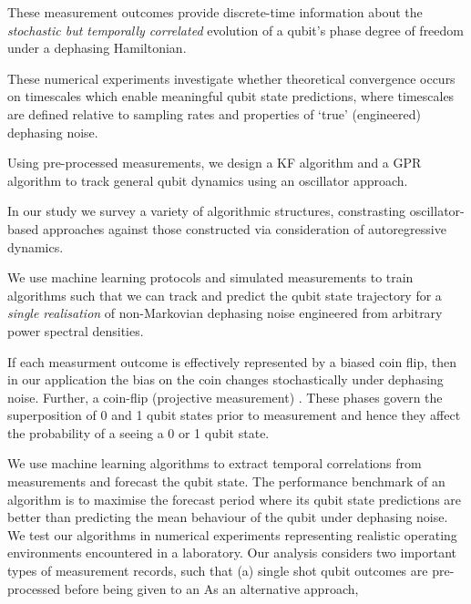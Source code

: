 \iffalse
These measurement outcomes provide discrete-time information about the \emph{stochastic but temporally correlated} evolution of a qubit's phase degree of freedom under a dephasing Hamiltonian. 

These numerical experiments investigate whether theoretical convergence occurs on timescales which enable meaningful qubit state predictions, where timescales are defined relative to sampling rates and properties of `true' (engineered) dephasing noise. 

 Using pre-processed measurements, we design a KF algorithm and a GPR algorithm to track general qubit dynamics using an oscillator approach. 
 
 In our study we survey a variety of algorithmic structures, constrasting oscillator-based approaches against those constructed via consideration of autoregressive dynamics. 
 
 We use machine learning protocols and simulated measurements to train algorithms such that we can track and predict the qubit state trajectory for a \textit{single realisation} of non-Markovian dephasing noise engineered from arbitrary power spectral densities.
  
  If each measurment outcome is effectively represented by a biased coin flip, then in our application the bias on the coin changes stochastically under dephasing noise. Further, a coin-flip (projective measurement) . These phases govern the superposition of 0 and 1 qubit states prior to measurement and hence they affect the probability of a seeing a 0 or 1 qubit state. 
 
 We use machine learning algorithms to extract temporal correlations from measurements and forecast the qubit state. The performance benchmark of an algorithm is to maximise the forecast period where its qubit state predictions are better than predicting the mean behaviour of the qubit under dephasing noise. We test our algorithms in numerical experiments representing realistic operating environments encountered in a laboratory. Our analysis considers two important types of measurement records, such that (a) single shot qubit outcomes are pre-processed before being given to an 
As an alternative approach, 

